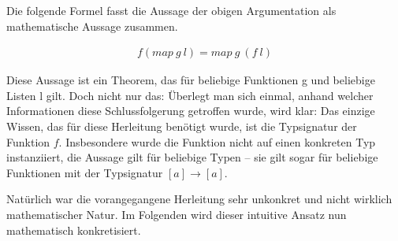 Die folgende Formel fasst die Aussage der obigen Argumentation als mathematische Aussage zusammen.




\begin{align*}
f (map\ g\ l) = map\ g\ (f\ l)
\end{align*}

Diese Aussage ist ein Theorem, das für beliebige Funktionen g und beliebige Listen l gilt. Doch nicht nur das: Überlegt man sich
einmal, anhand welcher Informationen diese Schlussfolgerung getroffen wurde, wird klar: Das einzige Wissen, das für diese Herleitung
benötigt wurde, ist die Typsignatur der Funktion $f$. Insbesondere wurde die Funktion nicht auf einen konkreten Typ instanziiert,
die Aussage gilt für beliebige Typen -- sie gilt sogar für beliebige Funktionen mit der Typsignatur $[a] \rightarrow [a]$.


Natürlich war die vorangegangene Herleitung sehr unkonkret und nicht wirklich mathematischer Natur. Im Folgenden wird dieser
intuitive Ansatz nun mathematisch konkretisiert.


